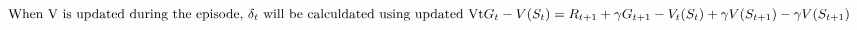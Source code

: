\documentclass{article}
\begin{document}

\[
  \begin{aligned}
    \text{When V is updated during the episode, }\delta_t \text{ will be calculdated using updated Vt}
    \noindent G_t - V (S_t) &= R_{t+1} + \gamma G_{t+1} - V_t(S_t) + \gamma V(S_{t+1}) - \gamma V(S_{t+1})
  \end{aligned}
\]
\end{document}
